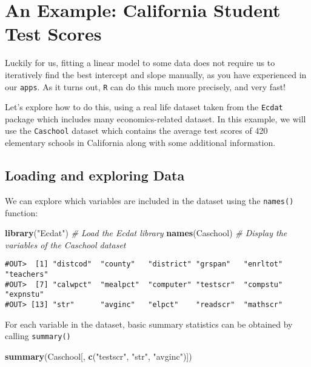 \documentclass[]{book}
\newenvironment{Shaded}{\begin{snugshade}}{\end{snugshade}}
\newcommand{\KeywordTok}[1]{\textcolor[rgb]{0.13,0.29,0.53}{\textbf{#1}}}
\newcommand{\StringTok}[1]{\textcolor[rgb]{0.31,0.60,0.02}{#1}}
\newcommand{\CommentTok}[1]{\textcolor[rgb]{0.56,0.35,0.01}{\textit{#1}}}
\newcommand{\NormalTok}[1]{#1}
\begin{document}
\section{An Example: California Student Test Scores}\label{lm-example1}

Luckily for us, fitting a linear model to some data does not require us
to iteratively find the best intercept and slope manually, as you have
experienced in our \texttt{apps}. As it turns out, \texttt{R} can do
this much more precisely, and very fast!

Let's explore how to do this, using a real life dataset taken from the
\texttt{Ecdat} package which includes many economics-related dataset. In
this example, we will use the \texttt{Caschool} dataset which contains
the average test scores of 420 elementary schools in California along
with some additional information.

\subsection{Loading and exploring
Data}\label{loading-and-exploring-data}

We can explore which variables are included in the dataset using the
\texttt{names()} function:

\begin{Shaded}
\begin{Highlighting}[]
\KeywordTok{library}\NormalTok{(}\StringTok{"Ecdat"}\NormalTok{) }\CommentTok{# Load the Ecdat library}
\KeywordTok{names}\NormalTok{(Caschool) }\CommentTok{# Display the variables of the Caschool dataset}
\end{Highlighting}
\end{Shaded}

\begin{verbatim}
#OUT>  [1] "distcod"  "county"   "district" "grspan"   "enrltot"  "teachers"
#OUT>  [7] "calwpct"  "mealpct"  "computer" "testscr"  "compstu"  "expnstu" 
#OUT> [13] "str"      "avginc"   "elpct"    "readscr"  "mathscr"
\end{verbatim}

For each variable in the dataset, basic summary statistics can be
obtained by calling \texttt{summary()}

\begin{Shaded}
\begin{Highlighting}[]
\KeywordTok{summary}\NormalTok{(Caschool[, }\KeywordTok{c}\NormalTok{(}\StringTok{"testscr"}\NormalTok{, }\StringTok{"str"}\NormalTok{, }\StringTok{"avginc"}\NormalTok{)])}
\end{Highlighting}
\end{Shaded}
\end{document}
